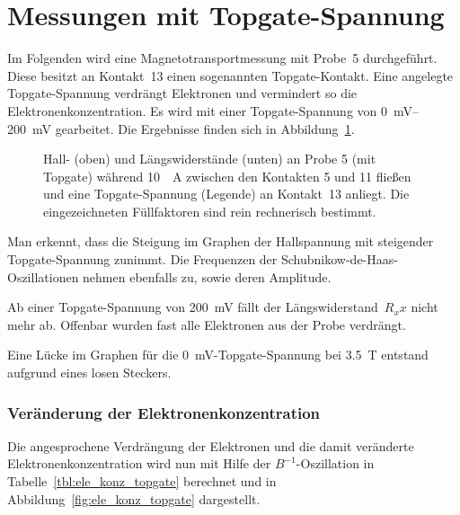 \documentclass[a4paper]{article}
\begin{document}
\newpage

\section*{Messungen mit Topgate-Spannung}

Im Folgenden wird eine Magnetotransportmessung mit Probe~5
durchgeführt. Diese besitzt an Kontakt~13 einen sogenannten Topgate-Kontakt.
Eine angelegte Topgate-Spannung verdrängt Elektronen und vermindert so
die Elektronenkonzentration.
Es wird mit einer Topgate-Spannung von \SI{0}{mV}--\SI{200}{mV} gearbeitet.
Die Ergebnisse finden sich in Abbildung~\ref{fig:magnetotransport_topgate}.

\begin{figure}[h!]
  \begin{center}
    
  \end{center}
  \caption{
	Hall- (oben) und Längswiderstände (unten) an Probe 5 (mit Topgate)
	während \SI{10}{\micro{}A} zwischen den Kontakten 5 und 11 fließen
	und eine Topgate-Spannung (Legende) an Kontakt~13 anliegt.
	Die eingezeichneten Füllfaktoren sind rein rechnerisch bestimmt.}
  \label{fig:magnetotransport_topgate}
\end{figure}

Man erkennt, dass die Steigung im Graphen der Hallspannung mit steigender
Topgate-Spannung zunimmt.
Die Frequenzen der Schubnikow-de-Haas-Oszillationen nehmen ebenfalls zu,
sowie deren Amplitude.

Ab einer Topgate-Spannung von \SI{200}{mV} fällt der Längswiderstand~$R_xx$
nicht mehr ab. Offenbar wurden fast alle Elektronen aus der Probe verdrängt.

Eine Lücke im Graphen für die \SI{0}{mV}-Topgate-Spannung bei \SI{3,5}{T}
entstand aufgrund eines losen Steckers.



\subsubsection*{Veränderung der Elektronenkonzentration}
Die angesprochene Verdrängung der Elektronen und die damit veränderte
Elektronenkonzentration wird nun mit Hilfe der $B^{-1}$-Oszillation
in Tabelle~\ref{tbl:ele_konz_topgate} berechnet und in
Abbildung~\ref{fig:ele_konz_topgate} dargestellt.
\end{document}

